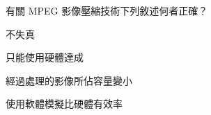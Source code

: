 \ifx\ntpcNinetyTwo\undefined[92學年基北區] \fi
有關 MPEG 影像壓縮技術下列敘述何者正確？
  \begin{optionlist}
  \item 不失真
  \item 只能使用硬體達成
  \item 經過處理的影像所佔容量變小\label{ntpc-92-a19}
  \item 使用軟體模擬比硬體有效率
  \end{optionlist}